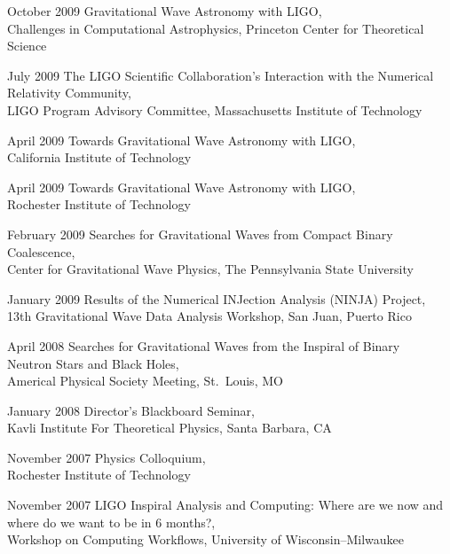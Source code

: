 \documentclass{cv}
\begin{document}
\begin{entry}
\item[October 2009] {Gravitational Wave Astronomy with LIGO},\\
{\small Challenges in Computational Astrophysics, Princeton Center for
Theoretical Science}

\item[July 2009] {The LIGO Scientific Collaboration's Interaction with the
Numerical Relativity Community},\\
{\small LIGO Program Advisory Committee, Massachusetts Institute of Technology}

\item[April 2009] {Towards Gravitational Wave Astronomy with LIGO},\\
{\small California Institute of Technology}

\item[April 2009] {Towards Gravitational Wave Astronomy with LIGO},\\
{\small Rochester Institute of Technology}

\item[February 2009] {Searches for Gravitational Waves from Compact Binary Coalescence},\\
{\small Center for Gravitational Wave Physics, The Pennsylvania State University}

\item[January 2009] {Results of the Numerical INJection Analysis (NINJA) Project},\\
{\small 13th Gravitational Wave Data Analysis Workshop, San Juan, Puerto Rico}

\item[April 2008] {Searches for Gravitational Waves from the Inspiral of Binary \\ Neutron Stars and Black Holes},\\
{\small Americal Physical Society Meeting, St.~Louis, MO}

\item[January 2008] {Director's Blackboard Seminar},\\
{\small Kavli Institute For Theoretical Physics, Santa Barbara, CA}

\item[November 2007] {Physics Colloquium},\\
{\small Rochester Institute of Technology}

\item[November 2007] {LIGO Inspiral Analysis and Computing: Where are we now and where do we want to be in 6 months?},\\
{\small Workshop on Computing Workflows, University of Wisconsin--Milwaukee}


\end{entry}
\end{document}

